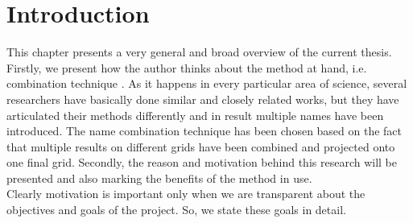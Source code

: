 \chapter{Introduction}
\label{chapter:Introduction}

This chapter presents a very general and broad overview of the current thesis. Firstly, we present how the author thinks about the method at hand, i.e. combination technique \cite{Griebel1992b}. As it happens in every particular area of science, several researchers have basically done similar and closely related works, but they have articulated their methods differently and in result multiple names have been introduced. The name combination technique has been chosen based on the fact that multiple results on different grids have been combined and projected onto one final grid. Secondly, the reason and motivation behind this research will be presented and also marking the benefits of the method in use.\\
Clearly motivation is important only when we are transparent about the objectives and goals of the project. So, we state these goals in detail.
